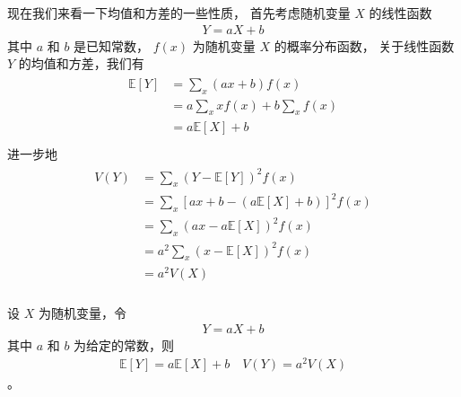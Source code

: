 \documentclass[letterpaper,10pt,english]{sphinxmanual}
\begin{document}
现在我们来看一下均值和方差的一些性质，
首先考虑随机变量 \(X\) 的线性函数
\begin{equation}\label{equation:概率基础/content:概率基础/content:45}
\begin{split}Y = aX +b\end{split}
\end{equation}
其中 \(a\) 和 \(b\) 是已知常数，
\(f(x)\) 为随机变量  \(X\) 的概率分布函数，
关于线性函数 \(Y\) 的均值和方差，我们有
\begin{align}\label{equation:概率基础/content:概率基础/content:46}\!\begin{aligned}
\mathbb{E}[Y] &= \sum_x (ax+b) f(x)\\
&= a \sum_x x f(x) +  b \sum_x  f(x)\\
& = a \mathbb{E}[X] + b\\
\end{aligned}\end{align}
进一步地
\begin{align}\label{equation:概率基础/content:概率基础/content:47}\!\begin{aligned}
V(Y) &= \sum_x (Y - \mathbb{E}[Y])^2 f(x)\\
&= \sum_x [ax+b -  (a \mathbb{E}[X] + b)  ]^2 f(x)\\
&= \sum_x (ax - a \mathbb{E}[X] )^2 f(x)\\
&= a^2 \sum_x (x - \mathbb{E}[X]  )^2 f(x)\\
&= a^2 V(X)\\
\end{aligned}\end{align}
\begin{sphinxShadowBox}

设 \(X\) 为随机变量，令
\begin{equation}\label{equation:概率基础/content:概率基础/content:48}
\begin{split}Y = aX +b\end{split}
\end{equation}
其中 \(a\) 和 \(b\) 为给定的常数，则
\begin{equation}\label{equation:概率基础/content:概率基础/content:49}
\begin{split}\mathbb{E}[Y]=a \mathbb{E}[X] + b \quad V(Y)= a^2 V(X)\end{split}
\end{equation}
。
\end{sphinxShadowBox}
\end{document}
